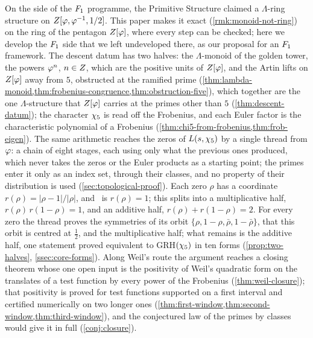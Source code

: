 On the side of the $F_1$ programme, the Primitive Structure claimed a $\Lambda$-ring structure on
$Z[\varphi,\varphi^{-1},1/2]$.  This paper makes it exact (\cref{rmk:monoid-not-ring}) on the ring
of the pentagon $Z[\varphi]$, where every step can be checked; here we develop the $F_1$ side that we left
undeveloped there, as our proposal for an $F_1$ framework.  The descent datum has two halves: the
$\Lambda$-monoid of the golden tower, the powers $\varphi^n$, $n\in Z$, which are the positive units of
$Z[\varphi]$, and the Artin lifts on $Z[\varphi]$ away from $5$, obstructed at the ramified prime (\cref{thm:lambda-monoid,thm:frobenius-congruence,thm:obstruction-five}), which together are the one $\Lambda$-structure that $Z[\varphi]$ carries at the primes other than $5$ (\cref{thm:descent-datum}); the
character $\chi_5$ is read off the Frobenius, and each Euler factor is the characteristic
polynomial of a Frobenius (\cref{thm:chi5-from-frobenius,thm:frob-eigen}).  The same arithmetic
reaches the zeros of $L(s,\chi_5)$ by a single thread from $\varphi$: a chain of eight stages, each using only
what the previous ones produced, which never takes the zeros or the Euler products as a starting point; the primes
enter it only as an index set, through their classes, and no property of their distribution is used
(\cref{sec:topological-proof}).  Each zero $\rho$ has a coordinate $r(\rho)=|\rho-1|/|\rho|$, and \Ecore\ is $r(\rho)=1$; this splits
into a multiplicative half, $r(\rho)\,r(1-\rho)=1$, and an additive half, $r(\rho)+r(1-\rho)=2$.  For every zero the
thread proves the symmetries of its orbit $\{\rho,1-\rho,\bar\rho,1-\bar\rho\}$, that this orbit is centred at $\tfrac12$, and the
multiplicative half; what remains is the
additive half, one statement proved equivalent to GRH$(\chi_5)$ in ten forms
(\cref{prop:two-halves}, \cref{ssec:core-forms}).  Along Weil's route the argument reaches a closing theorem whose
one open input is the positivity of Weil's quadratic form on the translates of a test function by every power of the
Frobenius (\cref{thm:weil-closure}); that positivity is proved for test functions supported on a first interval and
certified numerically on two longer ones (\cref{thm:first-window,thm:second-window,thm:third-window}), and the conjectured law
of the primes by classes would give it in full (\cref{conj:closure}).


